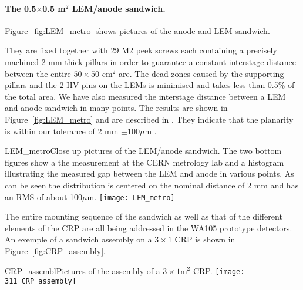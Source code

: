 \paragraph{The 0.5$\times$0.5 m$^2$ LEM/anode sandwich.}
Figure~\ref{fig:LEM_metro} shows pictures of the anode and LEM sandwich.  


They are fixed together with 29 M2 peek screws each containing a precisely machined 2 mm thick pillars in order to guarantee a
 constant interstage distance between the entire $50\times50$ cm$^2$ are.  The dead zones caused by the supporting pillars and the 2 HV
 pins on the LEMs is minimised and takes less than 0.5\% of the total area.  We have also measured the interstage distance between
 a LEM and anode sandwich in many points. The results are shown in Figure~\ref{fig:LEM_metro} and are described in \cite{EDMS_metro_lem_anode}. They indicate that the planarity is within our tolerance of 2 mm $\pm 100 \mu$m .


\begin{cdrfigure}{LEM_metro}{Close up pictures of the LEM/anode sandwich. The two
       bottom figures show a the measurement at the CERN metrology lab
       and a histogram illustrating the measured gap between the LEM
       and anode in various points. As can be seen the distribution is
       centered on the nominal distance of 2 mm and has an RMS of
       about 100$\mu$m.}
     \texttt{[image: LEM\_metro]}
\end{cdrfigure}

The entire mounting sequence of the sandwich as well as that of the different elements of the CRP are all being addressed in the  WA105 prototype detectors. An exemple of a sandwich assembly on a   $3\times1$ CRP is shown in Figure~\ref{fig:CRP_assembly}.

\begin{cdrfigure}{CRP_assembl}{Pictures of the assembly of a $3\times1$m$^2$ CRP.}
     \texttt{[image: 311\_CRP\_assembly]}  
\end{cdrfigure}